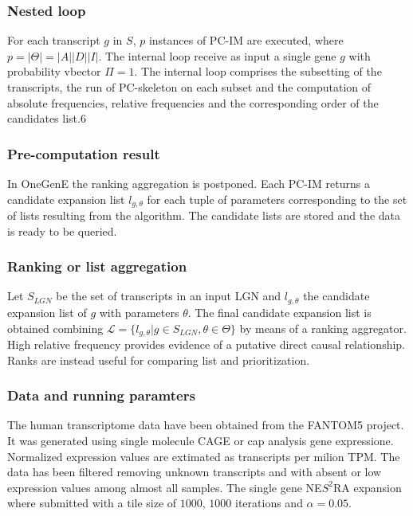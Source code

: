 		\subsubsection{Nested loop}
		For each transcript $g$ in $S$, $p$ instances of PC-IM are executed, where $p=|\Theta| = |A||D||I|$.
		The internal loop receive as input a single gene $g$ with probability vbector $\Pi = 1$.
		The internal loop comprises the subsetting of the transcripts, the run of PC-skeleton on each subset and the computation of absolute frequencies, relative frequencies and the corresponding order of the candidates list.6

		\subsubsection{Pre-computation result}
		In OneGenE the ranking aggregation is postponed.
		Each PC-IM returns a candidate expansion list $l_{g,\theta}$ for each tuple of parameters corresponding to the set of lists resulting from the algorithm.
		The candidate lists are stored and the data is ready to be queried.

		\subsubsection{Ranking or list aggregation}
		Let $S_{LGN}$ be the set of transcripts in an input LGN and $l_{g,\theta}$ the candidate expansion list of $g$ with parameters $\theta$.
		The final candidate expansion list is obtained combining $\mathcal{L} = \{l_{g,\theta}| g\in S_{LGN}, \theta\in\Theta\}$ by means of a ranking aggregator.
		High relative frequency provides evidence of a putative direct causal relationship.
		Ranks are instead useful for comparing list and prioritization.

		

	\subsubsection{Data and running paramters}
	The human transcriptome data have been obtained from the FANTOM5 project.
	It was generated using single molecule CAGE or cap analysis gene expressione.
	Normalized expression values are extimated as transcripts per milion TPM.
	The data has been filtered removing unknown transcripts and with absent or low expression values among almost all samples.
	The single gene NE$S^2$RA expansion where submitted with a tile size of $1000$, $1000$ iterations and $\alpha=0.05$.


